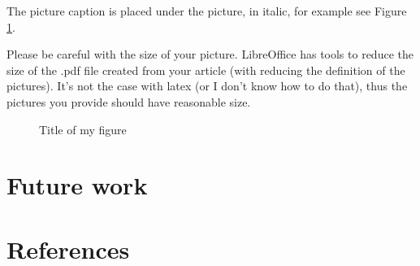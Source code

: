 \documentclass[11pt,a4paper]{article}
\begin{document}
The picture caption is placed under the picture, in italic, for example see Figure \ref{fig:O3}.

Please be careful with the size of your picture. LibreOffice has tools to reduce the size of the .pdf file created from your article (with reducing the definition of the pictures). It's not the case with latex (or I don't know how to do that), thus the pictures you provide should have reasonable size.

\begin{figure}[ht] %
\begin{center}
  \centerline{
  }
\end{center}
  {\center\it\caption{\label{fig:O3}
   Title of my figure}}
\end{figure}

\section{Future work}


\section{References}





\end{document}
